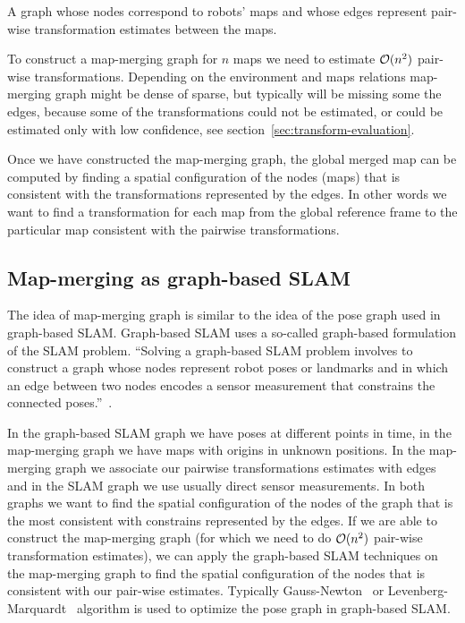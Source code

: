 \begin{defn}
    \label{def:map-merging-graph}
    A graph whose nodes correspond to robots' maps and whose edges represent pair-wise transformation estimates between the maps.
\end{defn}

To construct a map-merging graph for $n$ maps we need to estimate $\operatorname{\mathcal{O}}(n^2)$ pair-wise transformations. Depending on the environment and maps relations map-merging graph might be dense of sparse, but typically will be missing some the edges, because some of the transformations could not be estimated, or could be estimated only with low confidence, see section~\ref{sec:transform-evaluation}.

Once we have constructed the map-merging graph, the global merged map can be computed by finding a spatial configuration of the nodes (maps) that is consistent with the transformations represented by the edges. In other words we want to find a transformation for each map from the global reference frame to the particular map consistent with the pairwise transformations.

\subsection{Map-merging as graph-based SLAM}

The idea of map-merging graph is similar to the idea of the pose graph used in graph-based \gls{SLAM}. Graph-based \gls{SLAM} uses a so-called graph-based formulation of the \gls{SLAM} problem. ``Solving a graph-based \gls{SLAM} problem involves to construct a graph whose nodes represent robot poses or landmarks and in which an edge between two nodes encodes a sensor measurement that constrains the connected poses.''~\citet{grisetti2010tutorial}.

In the graph-based \gls{SLAM} graph we have poses at different points in time, in the map-merging graph we have maps with origins in unknown positions. In the map-merging graph we associate our pairwise transformations estimates with edges and in the \gls{SLAM} graph we use usually direct sensor measurements. In both graphs we want to find the spatial configuration of the nodes of the graph that is the most consistent with constrains represented by the edges. If we are able to construct the map-merging graph (for which we need to do $\operatorname{\mathcal{O}}(n^2)$ pair-wise transformation estimates), we can apply the graph-based \gls{SLAM} techniques on the map-merging graph to find the spatial configuration of the nodes that is consistent with our pair-wise estimates. Typically Gauss-Newton~\citet{fletcher2013practical} or Levenberg-Marquardt~\citet{more1978levmarq} algorithm is used to optimize the pose graph in graph-based \gls{SLAM}.

